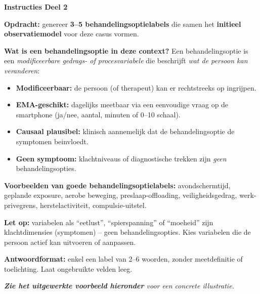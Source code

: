 \documentclass[11pt,a4paper]{article}
\begin{document}
\begin{tcolorbox}[colback=green!3,colframe=ForestGreen,arc=2.5mm,boxrule=0.9pt,
  left=10pt,right=10pt,top=9pt,bottom=9pt]
\textbf{\color{ForestGreen}Instructies Deel 2}

\smallskip\small
\textbf{Opdracht:} genereer \textbf{3--5 behandelingsoptielabels} die samen het
\textbf{initieel observatiemodel} voor deze casus vormen.

\textbf{Wat is een behandelingsoptie in deze context?}
Een behandelingsoptie is een \emph{modificeerbare gedrags- of procesvariabele} die beschrijft
\emph{wat de persoon kan veranderen}:
\begin{itemize}[topsep=2pt,itemsep=1pt]
\item \textbf{Modificeerbaar:} de persoon (of therapeut) kan er rechtstreeks op ingrijpen.
\item \textbf{EMA-geschikt:} dagelijks meetbaar via een eenvoudige vraag op de smartphone
(ja/nee, aantal, minuten of 0--10 schaal).
\item \textbf{Causaal plausibel:} klinisch aannemelijk dat de behandelingsoptie de symptomen beinvloedt.
\item \textbf{Geen symptoom:} klachtniveaus of diagnostische trekken zijn
\emph{geen} behandelingsopties.
\end{itemize}

\textbf{Voorbeelden van goede behandelingsoptielabels:}
avondschermtijd, geplande exposure, aerobe beweging, preslaap-offloading,
veiligheidsgedrag, werk-privegrens, herstelactiviteit, compulsie-uitstel.

\textbf{Let op:} variabelen als ``eetlust'', ``spierspanning'' of ``moeheid'' zijn
klachtdimensies (symptomen) -- geen behandelingsopties. Kies variabelen die de persoon
actief kan uitvoeren of aanpassen.

\textbf{Antwoordformat:} enkel een label van 2--6 woorden, zonder meetdefinitie of toelichting.
Laat ongebruikte velden leeg.

\medskip
\textit{\textbf{Zie het uitgewerkte voorbeeld hieronder} voor een concrete illustratie.}
\end{tcolorbox}

\vspace{0.5em}
\nopagebreak[4]
\end{document}
